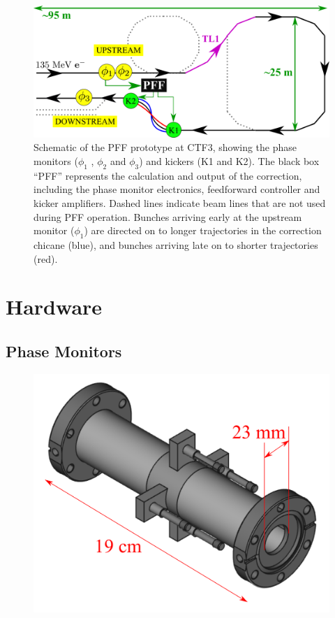 \documentclass[%
 reprint,
 superscriptaddress,
 amsmath,
 amssymb,
 prstab,
]{revtex4-1}
\begin{document}
\begin{figure}
	\includegraphics[width=\textwidth]{figs/intro/ctfpffLayout}%
	\caption{\label{f:pffLayout}Schematic of the PFF prototype at CTF3, 
	showing the phase monitors (\(\phi_1\) , 
	\(\phi_2\) and \(\phi_3\)) and kickers (K1 and K2). The black box “PFF” 
	represents the calculation and output of the correction, including the 
	phase monitor electronics, feedforward controller and kicker amplifiers.
	Dashed lines indicate beam lines that are not used during PFF operation. 
	Bunches arriving early at the upstream monitor (\(\phi_1\)) are directed 
	on to longer trajectories in the correction chicane (blue), and bunches 
	arriving late on to shorter trajectories (red).
		}
\end{figure}

\section{\label{s:hw}Hardware}

\subsection{\label{ss:phMon}Phase Monitors}

\begin{figure}
	\includegraphics[width=\columnwidth]{figs/hw/phMonTechDraw}%
	\caption{\label{f:phMonTechDraw}
	}
\end{figure}
\end{document}
